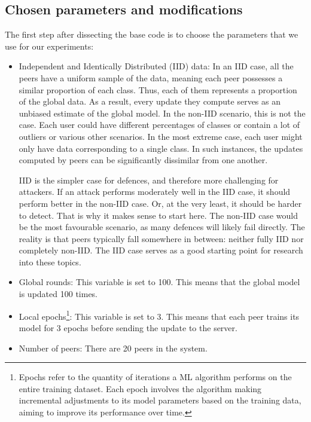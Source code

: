 \subsection{Chosen parameters and modifications}\label{sec:chosen_parameters}
The first step after dissecting the base code \cite{LFighter_code} is to choose the parameters that we use for our experiments:
\begin{itemize}
        \item Independent and Identically Distributed (IID) data: In an IID case, all the peers have a uniform sample of the data, meaning each peer possesses a similar proportion of each class. Thus, each of them represents a proportion of the global data. As a result, every update they compute serves as an unbiased estimate of the global model. In the non-IID scenario, this is not the case. Each user could have different percentages of classes or contain a lot of outliers or various other scenarios. In the most extreme case, each user might only have data corresponding to a single class. In such instances, the updates computed by peers can be significantly dissimilar from one another. 
        
        IID is the simpler case for defences, and therefore more challenging for attackers. If an attack performs moderately well in the IID case, it should perform better in the non-IID case. Or, at the very least, it should be harder to detect. That is why it makes sense to start here. The non-IID case would be the most favourable scenario, as many defences will likely fail directly. The reality is that peers typically fall somewhere in between: neither fully IID nor completely non-IID. The IID case serves as a good starting point for research into these topics.
        \item Global rounds: This variable is set to 100. This means that the global model is updated 100 times.
        \item Local epochs\footnote{Epochs refer to the quantity of iterations a ML algorithm performs on the entire training dataset. Each epoch involves the algorithm making incremental adjustments to its model parameters based on the training data, aiming to improve its performance over time.}: This variable is set to 3. This means that each peer trains its model for 3 epochs before sending the update to the server.
        \item Number of peers: There are 20 peers in the system. 
\end{itemize}
